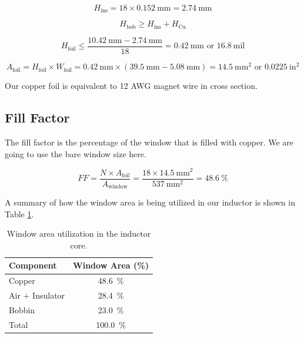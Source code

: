 \documentclass{article}
\begin{document}
\begin{equation}
    H_{\text{ins}} = \num{18} \times \SI{0.152}{\milli\meter} = \SI{2.74}{\milli\meter}
\end{equation}

\begin{equation}
    H_{\text{bob}} \geq H_{\text{ins}} + H_{\text{Cu}}
\end{equation}

\begin{equation}
    H_{\text{foil}} \leq \frac{\SI{10.42}{\milli\meter} - \SI{2.74}{\milli\meter}}{\num{18}} = \SI{0.42}{\milli\meter} \text{ or } \SI{16.8}{\text{mil}}
\end{equation}

\begin{equation}
    A_{\text{foil}} = H_{\text{foil}} \times W_{\text{foil}} = \SI{0.42}{\milli\meter} \times (\SI{39.5}{\milli\meter} - \SI{5.08}{\milli\meter}) = \SI{14.5}{\milli\meter\squared} \text{ or } \SI{0.0225}{\text{in}^2}
\end{equation}

Our copper foil is equivalent to 12 AWG magnet wire in cross section.

\subsection{Fill Factor}
The fill factor is the percentage of the window that is filled with copper.  We are going to use the bare window size here.

\begin{equation}
FF = \frac{N \times A_\text{foil}}{A_\text{window}} = \frac{18 \times \SI{14.5}{\milli\meter\squared}}{\SI{537}{\milli\meter\squared}} = \SI{48.6}{\percent}
\end{equation}

A summary of how the window area is being utilized in our inductor is shown in Table \ref{tab:window_area}.

\begin{table}[H]
    \centering
    \begin{tabular}{l c}
        \hline
        Component & Window Area (\%) \\
        \hline
        Copper & \SI{48.6}{\percent} \\
        Air + Insulator & \SI{28.4}{\percent} \\
        Bobbin & \SI{23.0}{\percent} \\
        \hline
        Total & \SI{100.0}{\percent} \\
        \hline
    \end{tabular}
    \caption{Window area utilization in the inductor core.}
    \label{tab:window_area}
\end{table}
\end{document}
